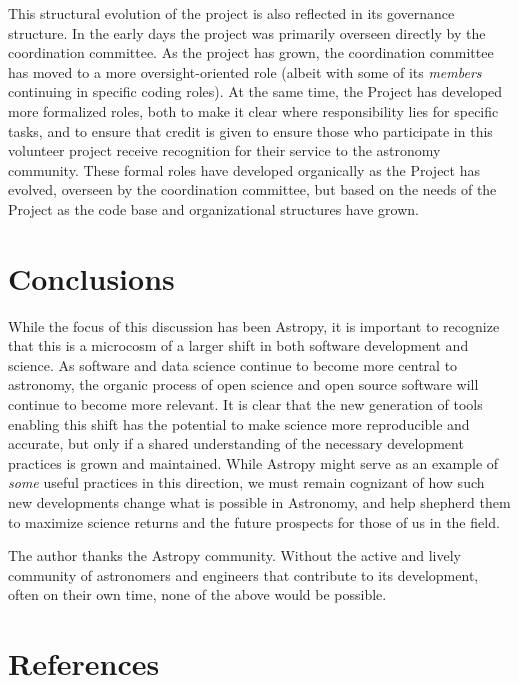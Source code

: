 \documentclass[11pt,twoside]{article}
\begin{document}
This structural evolution of the project is also reflected in its governance structure.
In the early days the project was primarily overseen directly by the coordination committee.
As the project has grown, the coordination committee has moved to a more oversight-oriented role (albeit with some of its \emph{members} continuing in specific coding roles).
At the same time, the Project has developed more formalized roles, both to make it clear where responsibility  lies for specific tasks, and to ensure that credit is given to ensure those who participate in this volunteer project receive recognition for their service to the astronomy community.
These formal roles have developed organically as the Project has evolved, overseen by the coordination committee, but based on the needs of the Project as the code base and organizational structures have grown.

\section{Conclusions}

While the focus of this discussion has been Astropy, it is important to recognize that this is a microcosm of a larger shift in both software development and science.
As software and data science continue to become more central to astronomy, the organic process of open science and open source software will continue to become more relevant.
It is clear that the new generation of tools enabling this shift has the potential to make science more reproducible and accurate\citep{ram13}, but only if a shared understanding of the necessary development practices is grown and maintained.
While Astropy might serve as an example of \emph{some} useful practices in this direction, we must remain cognizant of how such new developments change what is possible in Astronomy, and help shepherd them to maximize science returns and the future prospects for those of us in the field.


\acknowledgements The author thanks the Astropy community.  Without the active
and lively community of astronomers and engineers that contribute to its
development, often on their own time, none of the above would be possible.

\section{References}

\end{document}
